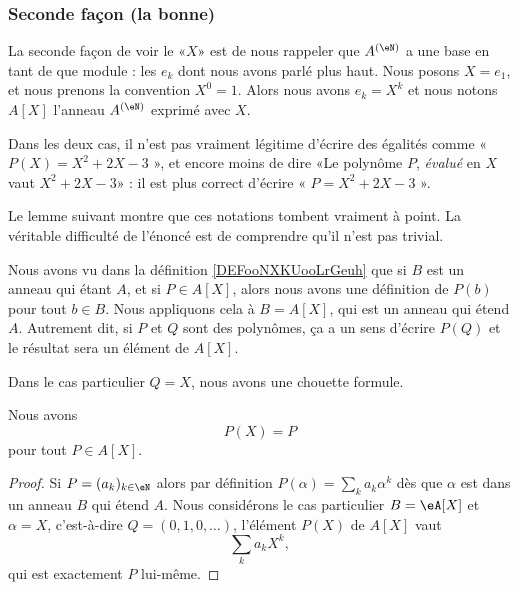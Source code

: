 \subsubsection{Seconde façon (la bonne)}
\label{SUBSUBSECooPNBYooWXEHrg}

La seconde façon de voir le «\( X\)» est de nous rappeler que \( A^{(\eN)}\) a une base en tant de que module : les \( e_k\) dont nous avons parlé plus haut. Nous posons \( X=e_1\), et nous prenons la convention \( X^0=1\). Alors nous avons \( e_k=X^k\) et nous notons \( A[X]\) l'anneau \(A^{(\eN)}\) exprimé avec \( X\).

Dans les deux cas, il n'est pas vraiment légitime d'écrire des égalités comme « \( P(X)=X^2+2X-3\) », et encore moins de dire «Le polynôme \( P\), \emph{évalué} en \( X\) vaut \( X^2+2X-3\)»  : il est plus correct d'écrire « \( P=X^2+2X-3\) ».

Le lemme suivant montre que ces notations tombent vraiment à point. La véritable difficulté de l'énoncé est de comprendre qu'il n'est pas trivial.

Nous avons vu dans la définition \ref{DEFooNXKUooLrGeuh} que si \( B\) est un anneau qui étant \( A\), et si \(P\in A[X] \), alors nous avons une définition de \( P(b)\) pour tout \( b\in B\). Nous appliquons cela à \( B=A[X]\), qui est un anneau qui étend \( A\). Autrement dit, si \( P\) et \( Q\) sont des polynômes, ça a un sens d'écrire \( P(Q)\) et le résultat sera un élément de \( A[X]\). 

Dans le cas particulier \( Q=X\), nous avons une chouette formule.
\begin{lemma}       \label{LEMooGKWQooVOyeDX}
    Nous avons
    \begin{equation}
        P(X)=P
    \end{equation}
    pour tout \( P\in A[X]\).
\end{lemma}

\begin{proof}
    Si \( P=(a_k)_{k\in \eN}\) alors par définition \( P(\alpha)=\sum_ka_k\alpha^k\) dès que \( \alpha\) est dans un anneau \( B\) qui étend \( A\). Nous considérons le cas particulier \( B=\eA[X]\) et \( \alpha=X\), c'est-à-dire \( Q=(0,1,0,\ldots)\), l'élément \( P(X)\) de \( A[X]\) vaut
    \begin{equation}        \label{EQooABULooFCEasf}
        \sum_ka_kX^k,
    \end{equation}
    qui est exactement \( P\) lui-même.
\end{proof}

